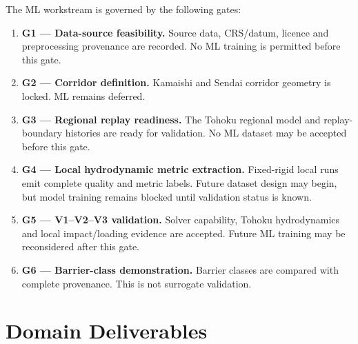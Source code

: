 \documentclass[12pt,a4paper]{article}
\begin{document}
The ML workstream is governed by the following gates:
\begin{enumerate}
  \item \textbf{G1 --- Data-source feasibility.} Source data,
    CRS/datum, licence and preprocessing provenance are recorded. No
    ML training is permitted before this gate.
  \item \textbf{G2 --- Corridor definition.} Kamaishi and Sendai
    corridor geometry is locked. ML remains deferred.
  \item \textbf{G3 --- Regional replay readiness.} The Tohoku regional
    model and replay-boundary histories are ready for validation. No
    ML dataset may be accepted before this gate.
  \item \textbf{G4 --- Local hydrodynamic metric extraction.}
    Fixed-rigid local runs emit complete quality and metric labels.
    Future dataset design may begin, but model training remains
    blocked until validation status is known.
  \item \textbf{G5 --- V1--V2--V3 validation.} Solver capability,
    Tohoku hydrodynamics and local impact/loading evidence are
    accepted. Future ML training may be reconsidered after this gate.
  \item \textbf{G6 --- Barrier-class demonstration.} Barrier classes
    are compared with complete provenance. This is not surrogate
    validation.
\end{enumerate}

\section{Domain Deliverables}
\label{sec:res-ml-domain-deliverables}












\clearpage
\printbibliography[
  heading=bibintoc,
  title={References}
]
\end{document}

